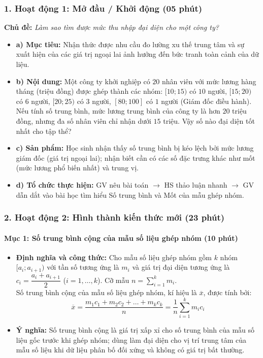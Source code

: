 \documentclass[12pt, a4paper]{article}
\begin{document}
\subsubsection*{1. Hoạt động 1: Mở đầu / Khởi động (05 phút)}
\textbf{Chủ đề:} \textit{Làm sao tìm được mức thu nhập đại diện cho một công ty?}
\begin{itemize}
    \item \textbf{a) Mục tiêu:} Nhận thức được nhu cầu đo lường xu thế trung tâm và sự xuất hiện của các giá trị ngoại lai ảnh hưởng đến bức tranh toàn cảnh của dữ liệu.
    \item \textbf{b) Nội dung:} Một công ty khởi nghiệp có $20$ nhân viên với mức lương hàng tháng (triệu đồng) được ghép thành các nhóm: $[10; 15)$ có $10$ người, $[15; 20)$ có $6$ người, $[20; 25)$ có $3$ người, $[80; 100]$ có $1$ người (Giám đốc điều hành). Nếu tính số trung bình, mức lương trung bình của công ty là hơn $20$ triệu đồng, nhưng đa số nhân viên chỉ nhận dưới $15$ triệu. Vậy số nào đại diện tốt nhất cho tập thể?
    \item \textbf{c) Sản phẩm:} Học sinh nhận thấy số trung bình bị kéo lệch bởi mức lương giám đốc (giá trị ngoại lai); nhận biết cần có các số đặc trưng khác như mốt (mức lương phổ biến nhất) và trung vị.
    \item \textbf{d) Tổ chức thực hiện:} GV nêu bài toán $\to$ HS thảo luận nhanh $\to$ GV dẫn dắt vào bài học tìm hiểu Số trung bình và Mốt của mẫu ghép nhóm.
\end{itemize}

\subsubsection*{2. Hoạt động 2: Hình thành kiến thức mới (23 phút)}

\paragraph{Mục 1: Số trung bình cộng của mẫu số liệu ghép nhóm (10 phút)}
\begin{itemize}
    \item \textbf{Định nghĩa và công thức:} Cho mẫu số liệu ghép nhóm gồm $k$ nhóm $[a_i; a_{i+1})$ với tần số tương ứng là $m_i$ và giá trị đại diện tương ứng là $c_i = \dfrac{a_i + a_{i+1}}{2}$ ($i = 1, \dots, k$). Cỡ mẫu $n = \sum_{i=1}^k m_i$.\\
    Số trung bình cộng của mẫu số liệu ghép nhóm, kí hiệu là $\overline{x}$, được tính bởi:
    $$\overline{x} = \dfrac{m_1 c_1 + m_2 c_2 + \dots + m_k c_k}{n} = \dfrac{1}{n} \sum_{i=1}^k m_i c_i$$
    \item \textbf{Ý nghĩa:} Số trung bình cộng là giá trị xấp xỉ cho số trung bình của mẫu số liệu gốc trước khi ghép nhóm; dùng làm đại diện cho vị trí trung tâm của mẫu số liệu khi dữ liệu phân bố đối xứng và không có giá trị bất thường.
\end{itemize}
\end{document}
